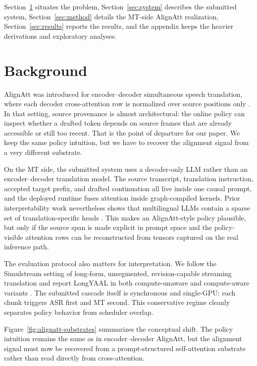 \documentclass[11pt]{article}
\begin{document}
Section~\ref{sec:background} situates the problem,
Section~\ref{sec:system} describes the submitted system,
Section~\ref{sec:method} details the MT-side AlignAtt realization,
Section~\ref{sec:results} reports the results, and the appendix keeps the
heavier derivations and exploratory analyses.

\section{Background}
\label{sec:background}

AlignAtt was introduced for encoder--decoder simultaneous speech translation,
where each decoder cross-attention row is normalized over source positions only
\citep{alignatt23}. In that setting, source provenance is almost architectural:
the online policy can inspect whether a drafted token depends on source frames
that are already accessible or still too recent. That is the point of departure
for our paper. We keep the same policy intuition, but we have to recover the
alignment signal from a very different substrate.

On the MT side, the submitted system uses a decoder-only LLM rather than an
encoder--decoder translation model. The source transcript, translation
instruction, accepted target prefix, and drafted continuation all live inside
one causal prompt, and the deployed runtime fuses attention inside
graph-compiled kernels. Prior interpretability work nevertheless shows that
multilingual LLMs contain a sparse set of translation-specific heads
\citep{tokenheads26}. This makes an AlignAtt-style policy plausible, but only
if the source span is made explicit in prompt space and the policy-visible
attention rows can be reconstructed from tensors captured on the real inference
path.

The evaluation protocol also matters for interpretation. We follow the
Simulstream setting of long-form, unsegmented, revision-capable streaming
translation \citep{simulstream25} and report LongYAAL in both compute-unaware
and compute-aware variants \citep{longyaal25}. The submitted cascade itself is
synchronous and single-GPU: each chunk triggers ASR first and MT second. This
conservative regime cleanly separates policy behavior from scheduler overlap.

Figure~\ref{fig:alignatt-substrates} summarizes the conceptual shift. The
policy intuition remains the same as in encoder--decoder AlignAtt, but the
alignment signal must now be recovered from a prompt-structured self-attention
substrate rather than read directly from cross-attention.
\end{document}
